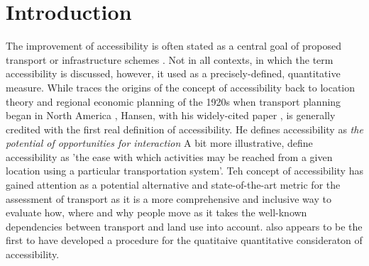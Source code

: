 \section{Introduction}
The improvement of accessibility is often stated as a central goal of proposed transport or infrastructure 
schemes \citep{GeursEtAl2012AccessibilityTransportIntroduction}. Not in all contexts, in which the term 
accessibility is discussed, however, it used as a precisely-defined, quantitative measure. While 
\citet{Batty2009AccessibilityUnifiedTheory} traces the origins of the concept of accessibility back to 
location theory and regional economic planning of the 1920s when transport planning began in North America
\citep{GeursEtAl2012AccessibilityTransportIntroduction}, 
Hansen, with his widely-cited paper \citep{Hansen1959HowAccessibilityShapesLandUse}, is generally credited 
with the first real definition of accessibility. He defines accessibility 
as \textit{the potential of opportunities for interaction} 
A bit more illustrative, \citet{MorrisEtAl1978AccessibilityIndicators} define accessibility as 'the ease with 
which activities may be reached from a given location using a particular transportation system'.
Teh concept of accessibility has gained attention as a potential alternative and state-of-the-art metric 
for the assessment of transport as it is a more comprehensive and inclusive way to evaluate how, where and why 
people move as it takes the well-known dependencies between transport and land use into account.
\citet{Hansen1959HowAccessibilityShapesLandUse} also appears to be the first to have developed a procedure for 
the quatitaive quantitative consideraton of accessibility.
%
%

